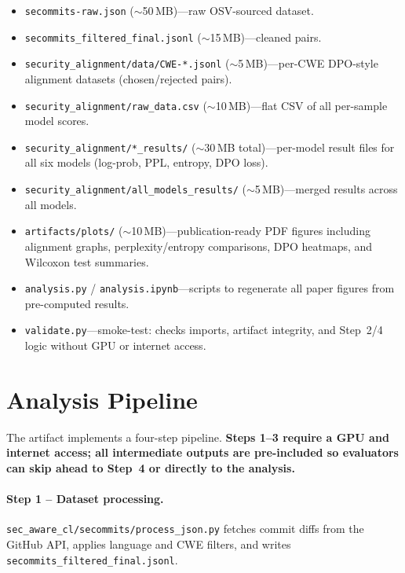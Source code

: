 \documentclass[conference]{IEEEtran}
\begin{document}
\begin{itemize}
  \item \texttt{secommits-raw.json} ($\sim$50\,MB)---raw OSV-sourced dataset.
  \item \texttt{secommits\_filtered\_final.jsonl} ($\sim$15\,MB)---cleaned pairs.
  \item \texttt{security\_alignment/data/CWE-*.jsonl} ($\sim$5\,MB)---per-CWE
        DPO-style alignment datasets (chosen/rejected pairs).
  \item \texttt{security\_alignment/raw\_data.csv} ($\sim$10\,MB)---flat CSV
        of all per-sample model scores.
  \item \texttt{security\_alignment/*\_results/} ($\sim$30\,MB total)---per-model
        result files for all six models (log-prob, PPL, entropy, DPO loss).
  \item \texttt{security\_alignment/all\_models\_results/} ($\sim$5\,MB)---merged
        results across all models.
  \item \texttt{artifacts/plots/} ($\sim$10\,MB)---publication-ready PDF figures
        including alignment graphs, perplexity/entropy comparisons,
        DPO heatmaps, and Wilcoxon test summaries.
  \item \texttt{analysis.py} / \texttt{analysis.ipynb}---scripts to regenerate
        all paper figures from pre-computed results.
  \item \texttt{validate.py}---smoke-test: checks imports, artifact integrity,
        and Step~2/4 logic without GPU or internet access.
\end{itemize}

\vspace{0.5cm}
\section{Analysis Pipeline}

The artifact implements a four-step pipeline. \textbf{Steps 1--3 require a
GPU and internet access; all intermediate outputs are pre-included so
evaluators can skip ahead to Step~4 or directly to the analysis.}

\paragraph{Step 1 -- Dataset processing.}
\texttt{sec\_aware\_cl/secommits/process\_json.py} fetches commit diffs from
the GitHub API, applies language and CWE filters, and writes
\texttt{secommits\_filtered\_final.jsonl}.
\end{document}
